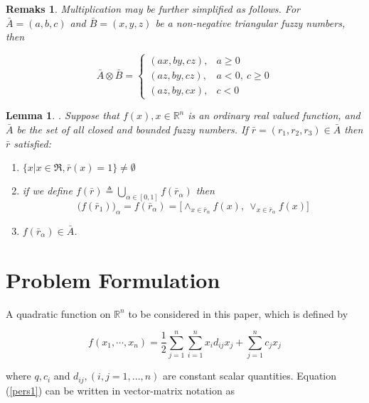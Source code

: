 \documentclass{iaesarticle3}
\newtheorem{rem}{Remaks}
\newtheorem{lem}{Lemma}
\begin{document}
\begin{rem}
    Multiplication may be further simplified as follows. For $\bar{A} = (a, b, c)$ and $\bar{B} = (x, y, z)$ be a non-negative triangular fuzzy numbers, then

    \begin{displaymath}
        \bar{A}\otimes \bar{B} =
        \left \{ \begin{array}{ll}
        (ax, by, cz),& a \geq 0 \\
        (az, by, cz), & a<0,\ c\geq 0\\
        (az, by, cx), & c<0
        \end{array} \right.
    \end{displaymath}
\end{rem}
\begin{lem}
    \cite{zoh}. Suppose that $f(x), x \in \mathbb{R}^n$ is an ordinary real valued function, and $\bar{A}$ be the set of all closed and bounded fuzzy numbers. If $\bar{r} =(r_1,r_2,r_3) \in \bar{A}$ then $\bar{r}$ satisfied:

\begin{enumerate}
    \item $\{x| x \in \Re, \bar{r}(x) = 1\} \neq \emptyset$
    \item if we define $f(\bar{r}) \triangleq \bigcup_{\alpha \in [0,1]}f(\bar{r}_\alpha)$ then
    \begin{displaymath}
        \Big(f(\bar{r}_1)\Big)_\alpha = f(\bar{r}_\alpha) = \Big[\wedge_{x \in \bar{r}_\alpha} f(x),\ \vee_{x\in \bar{r}_\alpha} f(x) \Big]
    \end{displaymath}
    \item $f(\bar{r}_\alpha) \in \bar{A}$.
\end{enumerate}
\end{lem}

\section{Problem Formulation}\label{pf}
A quadratic function on $\mathbb{R}^n$ to be considered in this paper, which is defined by

\begin{equation}\label{pers1}
    f(x_1,\cdots, x_n) = \frac{1}{2} \sum_{j=1}^n \sum_{i=1}^n x_id_{ij} x_j + \sum_{j=1}^nc_jx_j
\end{equation}

\noindent where $q, c_i$ and $d_{ij}, (i,j=1,...,n)$ are constant scalar quantities. Equation (\ref{pers1}) can be written in vector-matrix notation as
\end{document}
